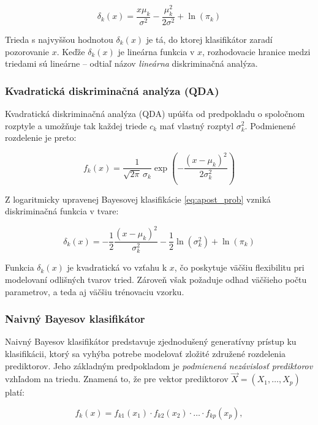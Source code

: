 \begin{equation}
\delta_k(x) = \frac{x \mu_k}{\sigma^2} - \frac{\mu_k^2}{2\sigma^2} + \ln(\pi_k)
\end{equation}

Trieda s najvyššou hodnotou $\delta_k(x)$ je tá, do ktorej klasifikátor zaradí pozorovanie $x$. Keďže $\delta_k(x)$ je lineárna funkcia v $x$, rozhodovacie hranice medzi triedami sú lineárne – odtiaľ názov \textit{lineárna} diskriminačná analýza.

\subsubsection{Kvadratická diskriminačná analýza (QDA)}
\label{subsubsec:qda}

Kvadratická diskriminačná analýza (QDA) upúšťa od predpokladu o spoločnom rozptyle a umožňuje tak každej triede $c_k$ mať vlastný rozptyl $\sigma_k^2$. Podmienené rozdelenie je preto:

\begin{equation}
f_k(x) = \frac{1}{\sqrt{2\pi} \, \sigma_k} \exp\left( -\frac{(x - \mu_k)^2}{2\sigma_k^2} \right)
\end{equation}

Z logaritmicky upravenej Bayesovej klasifikácie \eqref{eq:apost_prob} vzniká diskriminačná funkcia v tvare:

\begin{equation}
\delta_k(x) = -\frac{1}{2} \frac{(x - \mu_k)^2}{\sigma_k^2} - \frac{1}{2} \ln(\sigma_k^2) + \ln(\pi_k)
\end{equation}

Funkcia $\delta_k(x)$ je kvadratická vo vzťahu k $x$, čo poskytuje väčšiu flexibilitu pri modelovaní odlišných tvarov tried. Zároveň však požaduje odhad väčšieho počtu parametrov, a teda aj väčšiu trénovaciu vzorku.

\subsubsection{Naivný Bayesov klasifikátor}
\label{subsubsec:naivebayes}

Naivný Bayesov klasifikátor predstavuje zjednodušený generatívny prístup ku klasifikácii, ktorý sa vyhýba potrebe modelovať zložité združené rozdelenia prediktorov. Jeho základným predpokladom je \textit{podmienená nezávislosť prediktorov} vzhľadom na triedu. Znamená to, že pre vektor prediktorov $\vec{X} = (X_1, \dots, X_p)$ platí:

\begin{equation}
f_k(x) = f_{k1}(x_1) \cdot f_{k2}(x_2) \cdot \dots \cdot f_{kp}(x_p),
\end{equation}

